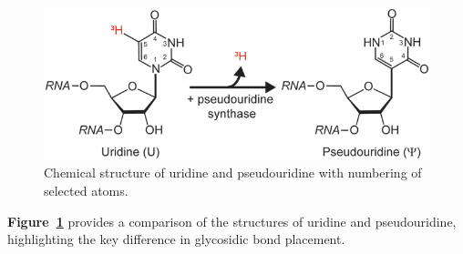   \begin{figure}[h!]
    \centering
    \includegraphics[width=.7\textwidth]{images/psi-synthesis}
%

    \caption{Chemical structure of uridine and pseudouridine with numbering of selected atoms.}
    \label{fig:structure-pseudouridine}
  \end{figure}

  \textbf{Figure~\ref{fig:structure-pseudouridine}} provides a comparison of the structures of uridine and pseudouridine, highlighting the key difference in glycosidic bond placement.
